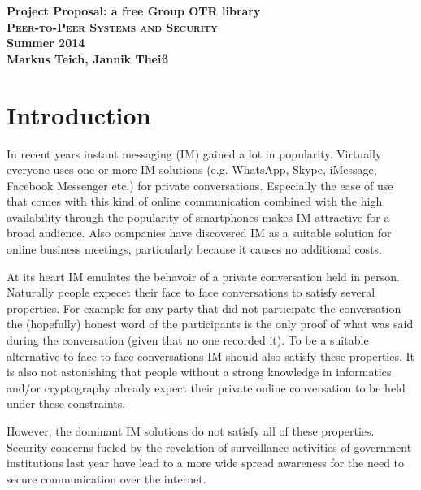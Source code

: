 

\title{}
\author{Markus Teich, Jannik Theiß}
\date{\today}



\begin{center}
\huge \textbf{Project Proposal: a free Group OTR library} \\
\vspace{2cm}
\LARGE\textbf{\textsc{Peer-to-Peer Systems and Security}}\\
\vspace{0.5cm}
\textbf{Summer 2014}\\
\textbf{Markus Teich, Jannik Theiß}
\vspace{3.5cm}
\end{center}


\section{Introduction}
In recent years instant messaging (IM) gained a lot in popularity. Virtually everyone uses one or more IM solutions (e.g. WhatsApp, Skype, iMessage, Facebook Messenger etc.) for private conversations. Especially the ease of use that comes with this kind of online communication combined with the high availability through the popularity of smartphones makes IM attractive for a broad audience. Also companies have discovered IM as a suitable solution for online business meetings, particularly because it causes no additional costs.

At its heart IM emulates the behavoir of a private conversation held in person. Naturally people expecet their face to face conversations to satisfy several properties. For example for any party that did not participate the conversation the (hopefully) honest word of the participants is the only proof of what was said during the conversation (given that no one recorded it). To be a suitable alternative to face to face conversations IM should also satisfy these properties. It is also not astonishing that people without a strong knowledge in informatics and/or cryptography already expect their private online conversation to be held under these constraints.


However, the dominant IM solutions do not satisfy all of these properties. Security concerns fueled by the revelation of surveillance activities of government institutions last year have lead to a more wide spread awareness for the need to secure communication over the internet.


